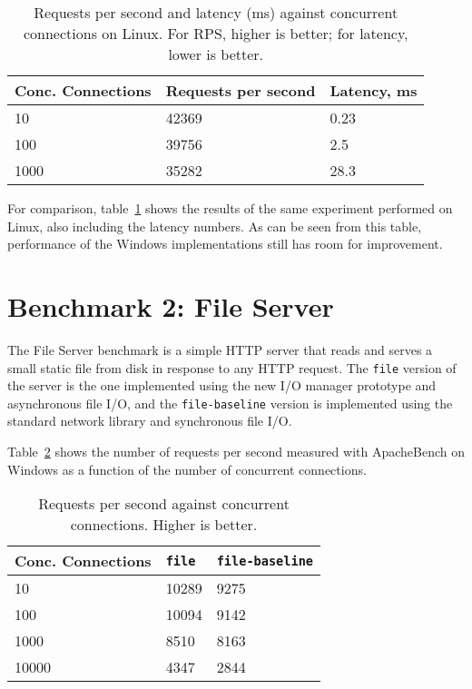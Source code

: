 \documentclass[a4paper,11pt,oneside]{report}
\begin{document}
\begin{table}[h!]
\centering
\begin{tabular}{ | l | l | l | }
  \hline
  Conc. Connections & Requests per second & Latency, ms \\
  \hline
  10 & 42369 & 0.23 \\
  \hline
  100 & 39756 & 2.5 \\
  \hline
  1000 & 35282 & 28.3 \\
  \hline
\end{tabular}
\caption{Requests per second and latency (ms) against concurrent connections on
  Linux. For RPS, higher is better; for latency, lower is better.}
\label{tbl:pong-linux}
\end{table}

For comparison, table~\ref{tbl:pong-linux} shows the results of the same
experiment performed on Linux, also including the latency numbers. As can be
seen from this table, performance of the Windows implementations still has room
for improvement.

\section{Benchmark 2: File Server}

The File Server benchmark is a simple HTTP server that reads and serves a small
static file from disk in response to any HTTP request. The \texttt{file} version
of the server is the one implemented using the new I/O manager prototype and
asynchronous file I/O, and the \texttt{file-baseline} version is implemented
using the standard network library and synchronous file I/O.

Table~\ref{tbl:file} shows the number of requests per second measured with
ApacheBench on Windows as a function of the number of concurrent connections.

\begin{table}[h!]
\centering
\begin{tabular}{ | l | l | l | }
  \hline
  Conc. Connections & \texttt{file} & \texttt{file-baseline} \\
  \hline
  10 & 10289 & 9275 \\
  \hline
  100 & 10094 & 9142 \\
  \hline
  1000 & 8510 & 8163 \\
  \hline
  10000 & 4347 & 2844 \\
  \hline
\end{tabular}
\caption{Requests per second against concurrent connections. Higher is better.}
\label{tbl:file}
\end{table}
\end{document}
